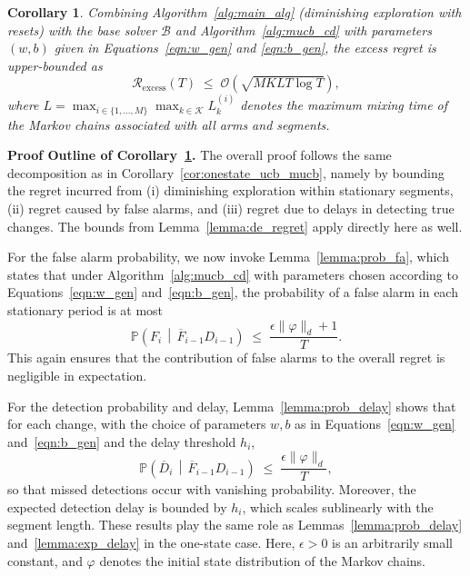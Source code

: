\documentclass[twoside]{article}
\theoremstyle{plain}
\newtheorem{corollary}[theorem]{Corollary}
\theoremstyle{definition}
\theoremstyle{remark}
\def\Rex{\mathcal{R}_{\mathrm{excess}}}
\begin{document}
\begin{corollary}\label{cor:general_mucb}
Combining Algorithm~\ref{alg:main_alg} (diminishing exploration with resets) 
with the base solver $\mathcal{B}$ and Algorithm~\ref{alg:mucb_cd} with parameters $(w,b)$ given in Equations~\ref{eqn:w_gen} and \ref{eqn:b_gen}, 
the excess regret is upper-bounded as
\begin{equation}
    \Rex(T) \;\le\; \mathcal{O}\!\left(\sqrt{MKLT\log T}\right),
\end{equation}
where $L = \max_{i \in \{1,\dots,M\}} \max_{k \in \mathcal{K}} L_k^{(i)}$ 
denotes the maximum mixing time of the Markov chains associated with all arms and segments.
\end{corollary}
\vspace{-10pt}
\textbf{Proof Outline of Corollary~\ref{cor:general_mucb}.}
The overall proof follows the same decomposition as in Corollary~\ref{cor:onestate_ucb_mucb}, namely by bounding the regret incurred from (i) diminishing exploration within stationary segments, (ii) regret caused by false alarms, and (iii) regret due to delays in detecting true changes. The bounds from Lemma~\ref{lemma:de_regret} apply directly here as well. 

For the false alarm probability, we now invoke Lemma~\ref{lemma:prob_fa}, which states that under Algorithm~\ref{alg:mucb_cd} with parameters chosen according to Equations~\ref{eqn:w_gen} and~\ref{eqn:b_gen}, the probability of a false alarm in each stationary period is at most
\begin{equation}
\mathbb{P}\!\left(F_i \,\middle|\, \overline F_{i-1} D_{i-1}\right) \;\le\; \frac{\epsilon\|\varphi\|_{d}+1}{T}.
\end{equation}
This again ensures that the contribution of false alarms to the overall regret is negligible in expectation. 

For the detection probability and delay, Lemma~\ref{lemma:prob_delay} shows that for each change, with the choice of parameters $w,b$ as in Equations~\ref{eqn:w_gen} and~\ref{eqn:b_gen} and the delay threshold $h_i$,
\begin{equation}
\mathbb{P}\!\left(\overline{D}_i \,\middle|\, \overline F_{i-1}D_{i-1}\right)\;\le\; \frac{\epsilon \|\varphi\|_{d}}{T},
\end{equation}
so that missed detections occur with vanishing probability. Moreover, the expected detection delay is bounded by $h_i$, which scales sublinearly with the segment length. These results play the same role as Lemmas~\ref{lemma:prob_delay} and~\ref{lemma:exp_delay} in the one-state case. Here, $\epsilon > 0$ is an arbitrarily small constant, and $\varphi$ denotes the initial state distribution of the Markov chains.
\end{document}
